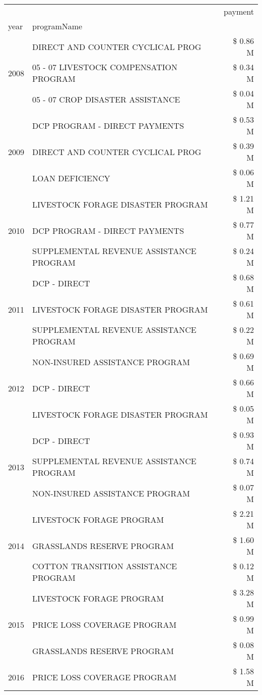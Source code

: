 \begin{tabular}{llr}
\toprule
 &  & payment \\
year & programName &  \\
\midrule
\multirow[t]{3}{*}{2008} & DIRECT AND COUNTER CYCLICAL PROG & \$ 0.86 M \\
 & 05 - 07 LIVESTOCK COMPENSATION PROGRAM & \$ 0.34 M \\
 & 05 - 07 CROP DISASTER ASSISTANCE & \$ 0.04 M \\
\cline{1-3}
\multirow[t]{3}{*}{2009} & DCP PROGRAM - DIRECT PAYMENTS & \$ 0.53 M \\
 & DIRECT AND COUNTER CYCLICAL PROG & \$ 0.39 M \\
 & LOAN DEFICIENCY & \$ 0.06 M \\
\cline{1-3}
\multirow[t]{3}{*}{2010} & LIVESTOCK FORAGE DISASTER  PROGRAM & \$ 1.21 M \\
 & DCP PROGRAM - DIRECT PAYMENTS & \$ 0.77 M \\
 & SUPPLEMENTAL REVENUE ASSISTANCE PROGRAM & \$ 0.24 M \\
\cline{1-3}
\multirow[t]{3}{*}{2011} & DCP - DIRECT & \$ 0.68 M \\
 & LIVESTOCK FORAGE DISASTER PROGRAM & \$ 0.61 M \\
 & SUPPLEMENTAL REVENUE ASSISTANCE PROGRAM & \$ 0.22 M \\
\cline{1-3}
\multirow[t]{3}{*}{2012} & NON-INSURED ASSISTANCE PROGRAM & \$ 0.69 M \\
 & DCP - DIRECT & \$ 0.66 M \\
 & LIVESTOCK FORAGE DISASTER PROGRAM & \$ 0.05 M \\
\cline{1-3}
\multirow[t]{3}{*}{2013} & DCP - DIRECT & \$ 0.93 M \\
 & SUPPLEMENTAL REVENUE ASSISTANCE PROGRAM & \$ 0.74 M \\
 & NON-INSURED ASSISTANCE PROGRAM & \$ 0.07 M \\
\cline{1-3}
\multirow[t]{3}{*}{2014} & LIVESTOCK FORAGE PROGRAM & \$ 2.21 M \\
 & GRASSLANDS RESERVE PROGRAM & \$ 1.60 M \\
 & COTTON TRANSITION ASSISTANCE PROGRAM & \$ 0.12 M \\
\cline{1-3}
\multirow[t]{3}{*}{2015} & LIVESTOCK FORAGE PROGRAM & \$ 3.28 M \\
 & PRICE LOSS COVERAGE PROGRAM & \$ 0.99 M \\
 & GRASSLANDS RESERVE PROGRAM & \$ 0.08 M \\
\cline{1-3}
\multirow[t]{3}{*}{2016} & PRICE LOSS COVERAGE PROGRAM & \$ 1.58 M \\

\end{tabular}

